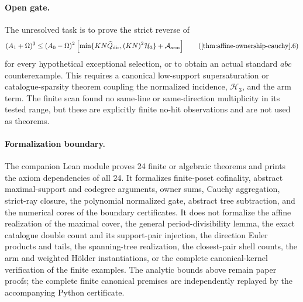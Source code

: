 \paragraph{Open gate.}
The unresolved task is to prove the strict reverse of
\[
 (A_1+\Omega)^3\le(A_0-\Omega)^2
 \left[\min\{KN\widehat Q_{\rm dir},(KN)^2\mathcal H_3\}
       +\mathcal A_{\rm arm}\right]
 \tag{\ref{thm:affine-ownership-cauchy}.6}
\]
for every hypothetical exceptional selection, or to obtain an actual
standard \(abc\) counterexample.  This requires a canonical low-support
supersaturation or catalogue-sparsity theorem coupling the normalized
incidence, \(\mathcal H_3\), and the arm term.  The finite scan found no
same-line or same-direction multiplicity in its tested range, but these are
explicitly finite no-hit observations and are not used as theorems.

\paragraph{Formalization boundary.}
The companion Lean module proves 24 finite or algebraic theorems and prints
the axiom dependencies of all 24.  It formalizes finite-poset cofinality,
abstract maximal-support and codegree arguments, owner sums, Cauchy
aggregation, strict-ray closure, the polynomial normalized gate, abstract
tree subtraction, and the numerical cores of the boundary certificates.
It does not formalize the affine realization of the maximal cover, the
general period-divisibility lemma, the exact catalogue double count and its
support-pair injection, the direction Euler products and tails, the
spanning-tree realization, the closest-pair shell counts, the arm and
weighted H\"older instantiations, or the complete canonical-kernel
verification of the finite examples.  The analytic bounds above remain
paper proofs; the complete finite canonical premises are independently
replayed by the accompanying Python certificate.
